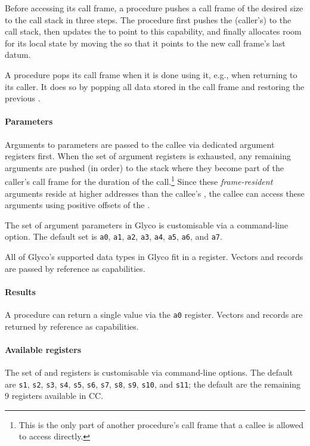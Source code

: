 \documentclass[main.tex]{subfiles}
\begin{document}
Before accessing its call frame, a procedure pushes a call frame of the desired size to the call stack in three steps. The procedure first pushes the (caller's)  to the call stack, then updates the  to point to this capability, and finally allocates room for its local state by moving the  so that it points to the new call frame's last datum.

A procedure pops its call frame when it is done using it, e.g., when returning to its caller. It does so by popping all data stored in the call frame and restoring the previous .

\paragraph{Parameters} Arguments to parameters are passed to the callee via dedicated argument registers first. When the set of argument registers is exhausted, any remaining arguments are pushed (in order) to the stack where they become part of the caller's call frame for the duration of the call.\footnote{This is the only part of another procedure's call frame that a callee is allowed to access directly.} Since these \emph{frame-resident} arguments reside at higher addresses than the callee's , the callee can access these arguments using positive offsets of the .

The set of argument parameters in Glyco is customisable via a command-line option. The default set is \texttt{a0}, \texttt{a1}, \texttt{a2}, \texttt{a3}, \texttt{a4}, \texttt{a5}, \texttt{a6}, and \texttt{a7}.

All of Glyco's supported data types in Glyco fit in a register. Vectors and records are passed by reference as capabilities.

\paragraph{Results} A procedure can return a single value via the \texttt{a0} register. Vectors and records are returned by reference as capabilities.

\paragraph{Available registers} The set of  and  registers is customisable via command-line options. The default  are \texttt{s1}, \texttt{s2}, \texttt{s3}, \texttt{s4}, \texttt{s5}, \texttt{s6}, \texttt{s7}, \texttt{s8}, \texttt{s9}, \texttt{s10}, and \texttt{s11}; the default  are the remaining 9 registers available in CC.
\end{document}
